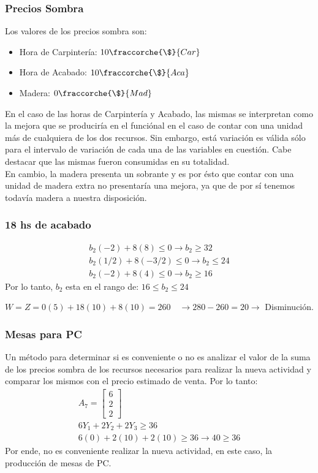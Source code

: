\begin{homeworkProblem}[1][Dakota]
\subsubsection{Precios Sombra}
Los valores de los precios sombra son:
\begin{itemize}
  \item Hora de Carpintería: $10 \fraccorche{\$}{Car}$
  \item Hora de Acabado: $10 \fraccorche{\$}{Aca}$
  \item Madera: $0 \fraccorche{\$}{Mad}$
\end{itemize}
En el caso de las horas de Carpintería y Acabado, las mismas se interpretan como la mejora que se produciría en el funciónal en el caso de contar con una unidad más de cualquiera de los dos recursos.
Sin embargo, está variación es válida sólo para el intervalo de variación de cada una de las variables en cuestión. Cabe destacar que las mismas fueron consumidas en su totalidad.\\

En cambio, la madera presenta un sobrante y es por ésto que contar con una unidad de madera extra no presentaría una mejora, ya que de por sí tenemos todavía madera a nuestra disposición.
\subsubsection{18 hs de acabado}

\begin{align*}
  b_2(-2) + 8(8) \le 0 \rightarrow b_2 \ge 32 \\
  b_2(1/2) + 8(-3/2) \le 0 \rightarrow b_2 \le 24 \\
  b_2(-2) + 8(4) \le 0 \rightarrow b_2 \ge 16
\end{align*}
Por lo tanto, $b_2$ esta en el rango de: $16  \le b_2 \le 24$

$W = Z = 0(5) + 18(10) + 8(10) = 260 \quad \rightarrow 280-260 = 20 \rightarrow$ Disminución.

\subsubsection{Mesas para PC}
Un método para determinar si es conveniente o no es analizar el valor de la suma de los precios sombra de los recursos necesarios para realizar la nueva actividad y comparar los mismos con el precio estimado de venta. Por lo tanto:
\begin{align*}
  A_7 =
  \begin{bmatrix}
    6  \\ 2 \\ 2
  \end{bmatrix} \\
  6Y_1+2Y_2+2Y_3 \ge 36 \\
  6(0) + 2(10) + 2(10) \ge 36 \rightarrow 40 \ge 36
\end{align*}
Por ende, no es conveniente realizar la nueva actividad, en este caso, la producción de mesas de PC.



\end{homeworkProblem}
